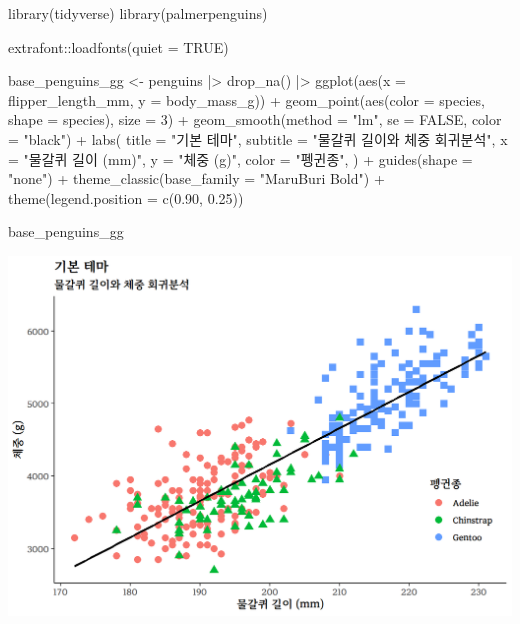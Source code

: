 \documentclass[
  letterpaper,
]{book}
\newenvironment{Shaded}{\begin{snugshade}}{\end{snugshade}}
\newcommand{\AttributeTok}[1]{\textcolor[rgb]{0.40,0.45,0.13}{#1}}
\newcommand{\ConstantTok}[1]{\textcolor[rgb]{0.56,0.35,0.01}{#1}}
\newcommand{\DecValTok}[1]{\textcolor[rgb]{0.68,0.00,0.00}{#1}}
\newcommand{\FloatTok}[1]{\textcolor[rgb]{0.68,0.00,0.00}{#1}}
\newcommand{\FunctionTok}[1]{\textcolor[rgb]{0.28,0.35,0.67}{#1}}
\newcommand{\NormalTok}[1]{\textcolor[rgb]{0.00,0.23,0.31}{#1}}
\newcommand{\OtherTok}[1]{\textcolor[rgb]{0.00,0.23,0.31}{#1}}
\newcommand{\SpecialCharTok}[1]{\textcolor[rgb]{0.37,0.37,0.37}{#1}}
\newcommand{\StringTok}[1]{\textcolor[rgb]{0.13,0.47,0.30}{#1}}
\begin{document}
\begin{Shaded}
\begin{Highlighting}[]
\FunctionTok{library}\NormalTok{(tidyverse)}
\FunctionTok{library}\NormalTok{(palmerpenguins)}

\NormalTok{extrafont}\SpecialCharTok{::}\FunctionTok{loadfonts}\NormalTok{(}\AttributeTok{quiet =} \ConstantTok{TRUE}\NormalTok{)}

\NormalTok{base\_penguins\_gg }\OtherTok{\textless{}{-}}\NormalTok{ penguins }\SpecialCharTok{|\textgreater{}} 
  \FunctionTok{drop\_na}\NormalTok{() }\SpecialCharTok{|\textgreater{}} 
  \FunctionTok{ggplot}\NormalTok{(}\FunctionTok{aes}\NormalTok{(}\AttributeTok{x =}\NormalTok{ flipper\_length\_mm, }\AttributeTok{y =}\NormalTok{ body\_mass\_g)) }\SpecialCharTok{+}
    \FunctionTok{geom\_point}\NormalTok{(}\FunctionTok{aes}\NormalTok{(}\AttributeTok{color =}\NormalTok{ species, }\AttributeTok{shape =}\NormalTok{ species), }\AttributeTok{size =} \DecValTok{3}\NormalTok{) }\SpecialCharTok{+}
    \FunctionTok{geom\_smooth}\NormalTok{(}\AttributeTok{method =} \StringTok{"lm"}\NormalTok{, }\AttributeTok{se =} \ConstantTok{FALSE}\NormalTok{, }\AttributeTok{color =} \StringTok{"black"}\NormalTok{)  }\SpecialCharTok{+}
    \FunctionTok{labs}\NormalTok{(}
      \AttributeTok{title =} \StringTok{"기본 테마"}\NormalTok{,}
      \AttributeTok{subtitle =} \StringTok{"물갈퀴 길이와 체중 회귀분석"}\NormalTok{,}
      \AttributeTok{x =} \StringTok{"물갈퀴 길이 (mm)"}\NormalTok{,}
      \AttributeTok{y =} \StringTok{"체중 (g)"}\NormalTok{,}
      \AttributeTok{color =} \StringTok{"펭귄종"}\NormalTok{,}
\NormalTok{    ) }\SpecialCharTok{+}
    \FunctionTok{guides}\NormalTok{(}\AttributeTok{shape =} \StringTok{"none"}\NormalTok{) }\SpecialCharTok{+}
    \FunctionTok{theme\_classic}\NormalTok{(}\AttributeTok{base\_family =} \StringTok{"MaruBuri Bold"}\NormalTok{) }\SpecialCharTok{+}
    \FunctionTok{theme}\NormalTok{(}\AttributeTok{legend.position =} \FunctionTok{c}\NormalTok{(}\FloatTok{0.90}\NormalTok{, }\FloatTok{0.25}\NormalTok{))}

\NormalTok{base\_penguins\_gg}
\end{Highlighting}
\end{Shaded}

\includegraphics{images/penguin_ggplot_base.png}
\end{document}
